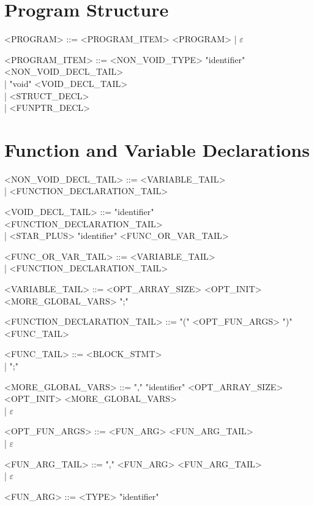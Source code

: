 \section{Program Structure}
\begin{grammar}
<PROGRAM> ::= <PROGRAM\_ITEM> <PROGRAM> | $\varepsilon$

<PROGRAM\_ITEM> ::= <NON\_VOID\_TYPE> "identifier" <NON\_VOID\_DECL\_TAIL> \\
                 | "void" <VOID\_DECL\_TAIL> \\
                 | <STRUCT\_DECL> \\
                 | <FUNPTR\_DECL>
\end{grammar}

\section{Function and Variable Declarations}
\begin{grammar}
<NON\_VOID\_DECL\_TAIL> ::= <VARIABLE\_TAIL> \\
                         | <FUNCTION\_DECLARATION\_TAIL>

<VOID\_DECL\_TAIL> ::= "identifier" <FUNCTION\_DECLARATION\_TAIL> \\
                    | <STAR\_PLUS> "identifier" <FUNC\_OR\_VAR\_TAIL>

<FUNC\_OR\_VAR\_TAIL> ::= <VARIABLE\_TAIL> \\
                       | <FUNCTION\_DECLARATION\_TAIL>

<VARIABLE\_TAIL> ::= <OPT\_ARRAY\_SIZE> <OPT\_INIT> <MORE\_GLOBAL\_VARS> ";"

<FUNCTION\_DECLARATION\_TAIL> ::= "(" <OPT\_FUN\_ARGS> ")" <FUNC\_TAIL>

<FUNC\_TAIL> ::= <BLOCK\_STMT> \\
               | ";"

<MORE\_GLOBAL\_VARS> ::= "," "identifier" <OPT\_ARRAY\_SIZE> <OPT\_INIT> <MORE\_GLOBAL\_VARS> \\
                      | $\varepsilon$

<OPT\_FUN\_ARGS> ::= <FUN\_ARG> <FUN\_ARG\_TAIL> \\
                   | $\varepsilon$

<FUN\_ARG\_TAIL> ::= "," <FUN\_ARG> <FUN\_ARG\_TAIL> \\
                   | $\varepsilon$

<FUN\_ARG> ::= <TYPE> "identifier"
\end{grammar}

